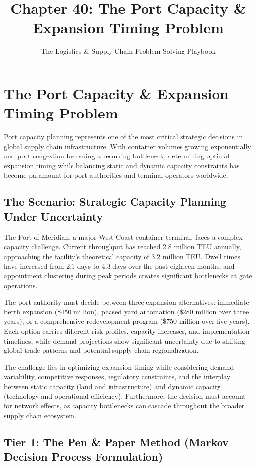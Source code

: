\documentclass{article}
\title{Chapter 40: The Port Capacity \& Expansion Timing Problem}
\author{The Logistics \& Supply Chain Problem-Solving Playbook}
\date{}
\begin{document}
\maketitle

\section{The Port Capacity \& Expansion Timing Problem}

Port capacity planning represents one of the most critical strategic decisions in global supply chain infrastructure. With container volumes growing exponentially and port congestion becoming a recurring bottleneck, determining optimal expansion timing while balancing static and dynamic capacity constraints has become paramount for port authorities and terminal operators worldwide.

\subsection{The Scenario: Strategic Capacity Planning Under Uncertainty}

The Port of Meridian, a major West Coast container terminal, faces a complex capacity challenge. Current throughput has reached 2.8 million TEU annually, approaching the facility's theoretical capacity of 3.2 million TEU. Dwell times have increased from 2.1 days to 4.3 days over the past eighteen months, and appointment clustering during peak periods creates significant bottlenecks at gate operations.

The port authority must decide between three expansion alternatives: immediate berth expansion (\$450 million), phased yard automation (\$280 million over three years), or a comprehensive redevelopment program (\$750 million over five years). Each option carries different risk profiles, capacity increases, and implementation timelines, while demand projections show significant uncertainty due to shifting global trade patterns and potential supply chain regionalization.

The challenge lies in optimizing expansion timing while considering demand variability, competitive responses, regulatory constraints, and the interplay between static capacity (land and infrastructure) and dynamic capacity (technology and operational efficiency). Furthermore, the decision must account for network effects, as capacity bottlenecks can cascade throughout the broader supply chain ecosystem.

\subsection{Tier 1: The Pen \& Paper Method (Markov Decision Process Formulation)}
\end{document}
